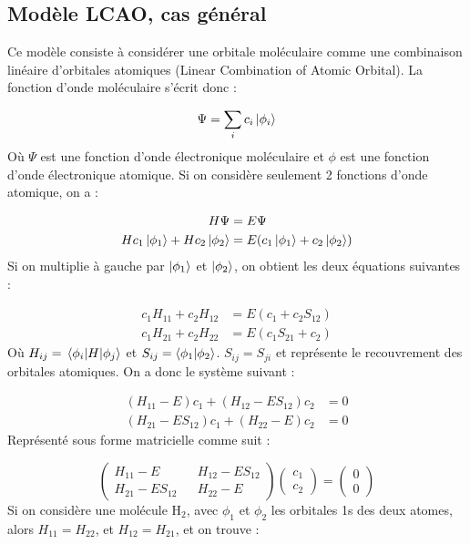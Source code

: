 \subsection{Modèle LCAO, cas général}


Ce modèle consiste à considérer une orbitale moléculaire comme une combinaison linéaire d’orbitales atomiques (Linear Combination of Atomic Orbital). La fonction d'onde moléculaire s'écrit donc :

\[ \Psi = \sum\limits_i c_i\ket{\phi_i} \]
Où $\Psi$ est une fonction d'onde électronique moléculaire et $\phi$ est une fonction d'onde électronique atomique.
Si on considère seulement 2 fonctions d'onde atomique, on a :

\begin{align*}
    H\Psi &= E\Psi\\
    Hc_1\ket{\phi_1} + Hc_2\ket{\phi_2}  &= E(c_1\ket{\phi_1} + c_2\ket{\phi_2})
\end{align*}
Si on multiplie à gauche par $\ket{\phi_1}$ et $\ket{\phi_2}$, on obtient les deux équations suivantes :

\begin{align*}
    c_1H_{11} + c_2H_{12} &= E(c_1+c_2S_{12})\\
    c_1H_{21} + c_2H_{22} &= E(c_1S_{21}+c_2)
\end{align*}
Où $H_{ij} = \mel{\phi_i}{H}{\phi_j}$ et $S_{ij} = \braket{\phi_1}{\phi_2}$. $S_{ij} = S_{ji}$ et représente le recouvrement des orbitales atomiques.
On a donc le système suivant :

\begin{align*}
    (H_{11} - E)c_1 + (H_{12} - ES_{12})c_2 &= 0\\
    (H_{21} - ES_{12})c_1 + (H_{22} - E)c_2 &= 0
\end{align*}
Représenté sous forme matricielle comme suit :

\[
    \begin{pmatrix}
        H_{11}-E && H_{12}-ES_{12}\\
        H_{21}-ES_{12} && H_{22}-E
    \end{pmatrix}
    \begin{pmatrix}
        c_1\\
        c_2
    \end{pmatrix}
    =
    \begin{pmatrix}
        0\\
        0
    \end{pmatrix}
\]
Si on considère une molécule H$_2$, avec $\phi_1$ et $\phi_2$ les orbitales 1s des deux atomes, alors $H_{11} = H_{22}$, et $H_{12} = H_{21}$, et on trouve :

